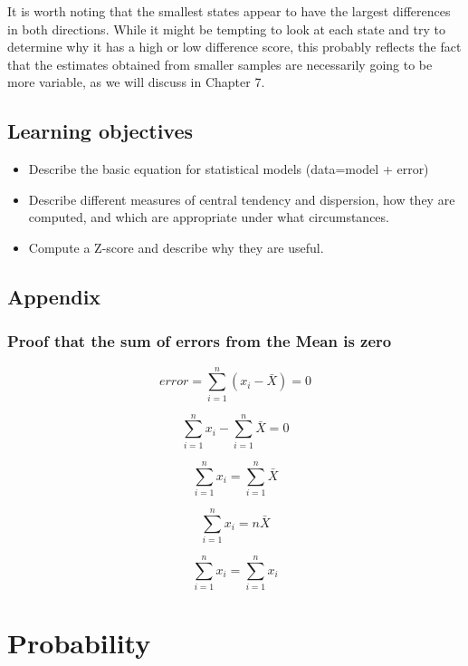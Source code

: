 \documentclass[
  12pt,
]{book}
\providecommand{\tightlist}{%
  \setlength{\itemsep}{0pt}\setlength{\parskip}{0pt}}
\begin{document}
It is worth noting that the smallest states appear to have the largest differences in both directions. While it might be tempting to look at each state and try to determine why it has a high or low difference score, this probably reflects the fact that the estimates obtained from smaller samples are necessarily going to be more variable, as we will discuss in Chapter 7.

\hypertarget{learning-objectives-4}{%
\section{Learning objectives}\label{learning-objectives-4}}

\begin{itemize}
\tightlist
\item
  Describe the basic equation for statistical models (data=model + error)
\item
  Describe different measures of central tendency and dispersion, how they are computed, and which are appropriate under what circumstances.
\item
  Compute a Z-score and describe why they are useful.
\end{itemize}

\hypertarget{appendix-1}{%
\section{Appendix}\label{appendix-1}}

\hypertarget{proof-that-the-sum-of-errors-from-the-mean-is-zero}{%
\subsection{Proof that the sum of errors from the Mean is zero}\label{proof-that-the-sum-of-errors-from-the-mean-is-zero}}

\[
error = \sum_{i=1}^{n}(x_i - \bar{X}) = 0
\]

\[
\sum_{i=1}^{n}x_i - \sum_{i=1}^{n}\bar{X}=0
\]

\[
\sum_{i=1}^{n}x_i = \sum_{i=1}^{n}\bar{X}
\]

\[
\sum_{i=1}^{n}x_i = n\bar{X}
\]

\[
\sum_{i=1}^{n}x_i = \sum_{i=1}^{n}x_i
\]

\hypertarget{probability}{%
\chapter{Probability}\label{probability}}
\end{document}
